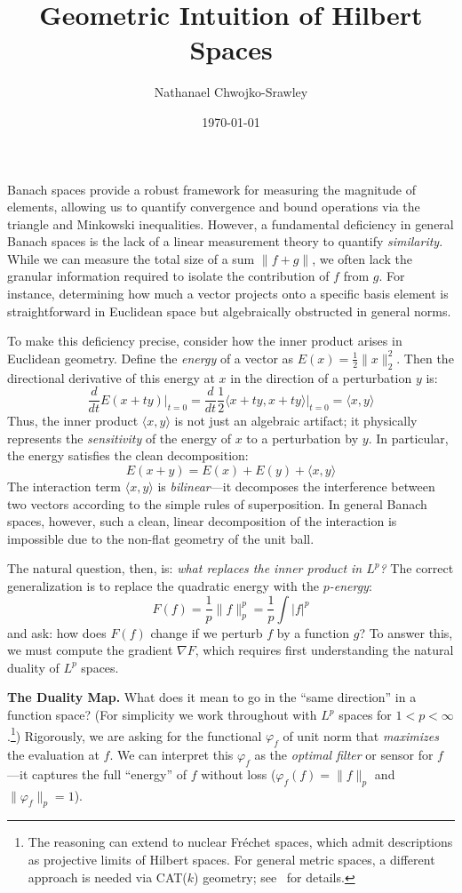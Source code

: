 \documentclass{article}
\title{Geometric Intuition of Hilbert Spaces}
\author{Nathanael Chwojko-Srawley}
\date{\today}
\renewcommand{\maketitle}{
    \quad
    \vspace{1em}
  \begin{center}
      \LARGE\bfseries \thetitle \par
      \vspace{0.6em}
      \large
  \end{center}
    \vspace{1em}
}
\let\temp\phi
\let\phi\varphi
\let\varphi\temp
\begin{document}
\maketitle
Banach spaces provide a robust framework for measuring the magnitude of elements, allowing us to quantify
convergence and bound operations via the triangle and Minkowski inequalities. However, a fundamental
deficiency in general Banach spaces is the lack of a linear measurement theory to quantify \emph{similarity}.
While we can measure the total size of a sum $\|f+g\|$, we often lack the granular information required to
isolate the contribution of $f$ from $g$. For instance, determining how much a vector projects onto a specific
basis element is straightforward in Euclidean space but algebraically obstructed in general norms.

To make this deficiency precise, consider how the inner product arises in Euclidean geometry. Define the
\emph{energy} of a vector as $E(x) = \frac{1}{2}\|x\|_2^2$. Then the directional derivative of this energy
at $x$ in the direction of a perturbation $y$ is:
\[
	\frac{d}{dt} E(x + ty) \Big|_{t=0}
		= \frac{d}{dt} \frac{1}{2} \langle x+ty, x+ty \rangle \Big|_{t=0}
		= \langle x, y \rangle
\]
Thus, the inner product $\langle x, y \rangle$ is not just an algebraic artifact; it physically represents
the \emph{sensitivity} of the energy of $x$ to a perturbation by $y$. In particular, the energy satisfies the
clean decomposition:
\[
	E(x + y) = E(x) + E(y) + \langle x, y \rangle
\]
The interaction term $\langle x, y \rangle$ is \emph{bilinear}---it decomposes the interference between two
vectors according to the simple rules of superposition. In general Banach spaces, however, such a clean, linear
decomposition of the interaction is impossible due to the non-flat geometry of the unit ball.

The natural question, then, is: \emph{what replaces the inner product in $L^p$?} The correct generalization is
to replace the quadratic energy with the \emph{$p$-energy}:
\[
	F(f) = \frac{1}{p}\|f\|_p^p = \frac{1}{p}\int |f|^p
\]
and ask: how does $F(f)$ change if we perturb $f$ by a function $g$? To answer this, we must compute the
gradient $\nabla F$, which requires first understanding the natural duality of $L^p$ spaces.

\medskip\noindent\textbf{The Duality Map.}\quad
What does it mean to go in the ``same direction'' in a function space? (For simplicity we work throughout with
$L^p$ spaces for $1 < p < \infty$.\footnote{The reasoning can extend to nuclear Fr\'echet spaces, which admit
descriptions as projective limits of Hilbert spaces. For general metric spaces, a different approach is needed
via CAT($k$) geometry; see~\cite{millerGEOMETRYMEASURECATk} for details.}) Rigorously, we are asking for the
functional $\phi_f$ of unit norm that \emph{maximizes} the evaluation at $f$. We can interpret this $\phi_f$
as the \emph{optimal filter} or sensor for $f$---it captures the full ``energy'' of $f$ without
loss ($\phi_f(f) = \|f\|_p$ and $\|\phi_f\|_p = 1$).
\end{document}
